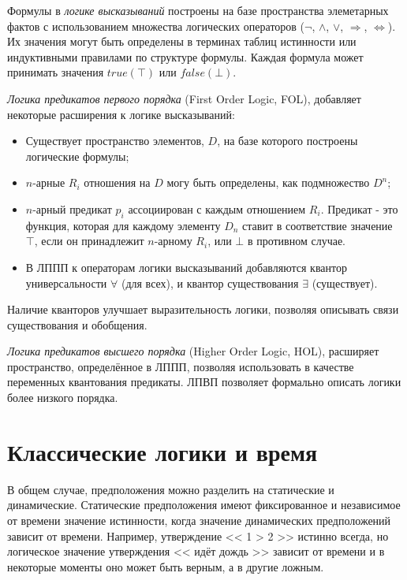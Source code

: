 		Формулы в \textit{логике высказываний} построены на базе пространства элеметарных фактов с использованием множества логических операторов ($ \neg $, $ \wedge $, $ \vee $, $ \Rightarrow $, $ \Leftrightarrow $). 
		Их значения могут быть определены в терминах таблиц истинности или индуктивными правилами по структуре формулы.
		Каждая формула может принимать значения $ true (\top) $ или $ false (\bot) $.
		
		\textit{Логика предикатов первого порядка} (First Order Logic, FOL), добавляет некоторые расширения к логике высказываний:
		\begin{itemize}
			\item Существует пространство элементов, $ D $, на базе которого построены логические формулы;
			\item $ n $-арные $ R_i $ отношения на $ D $ могу быть определены, как подмножество $ D^n $;
			\item $ n $-арный предикат $ p_i $ ассоциирован с каждым отношением $ R_i $.
			Предикат - это функция, которая для каждому элементу $ D_n $ ставит в соответствие значение $ \top $, если он принадлежит $ n $-арному $ R_i $, или $ \bot $ в противном случае.
			\item В ЛППП к операторам логики высказываний добавляются квантор универсальности $ \forall $ (для всех), и квантор существования $ \exists $ (существует).
		\end{itemize}
	Наличие кванторов улучшает выразительность логики, позволяя описывать связи существования и обобщения.
	
	\textit{Логика предикатов высшего порядка} (Higher Order Logic, HOL), расширяет пространство, определённое в ЛППП, позволяя использовать в качестве переменных квантования предикаты. ЛПВП позволяет формально описать логики более низкого порядка.
	
		
	
	\section{Классические логики и время}
	 В общем случае, предположения можно разделить на статические и динамические. 
	 Статические предположения имеют фиксированное и независимое от времени значение истинности, когда значение динамических предположений зависит от времени.
	 Например, утверждение << 1 > 2 >> истинно всегда, но логическое значение утверждения << идёт дождь >> зависит от времени и в некоторые моменты оно может быть верным, а в другие ложным.
	 
